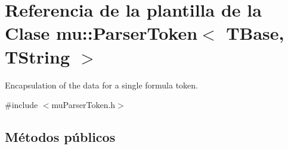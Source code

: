 \hypertarget{classmu_1_1_parser_token}{}\section{Referencia de la plantilla de la Clase mu\+:\+:Parser\+Token$<$ T\+Base, T\+String $>$}
\label{classmu_1_1_parser_token}


Encapsulation of the data for a single formula token.  




{\ttfamily \#include $<$mu\+Parser\+Token.\+h$>$}

\subsection*{Métodos públicos}
